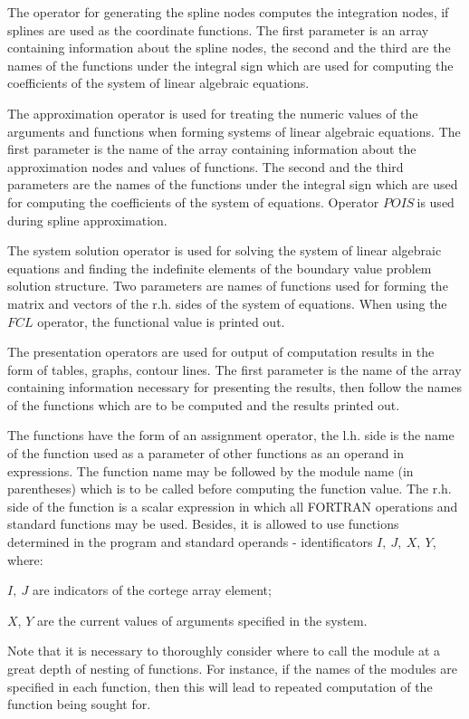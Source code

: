 The operator for generating the spline nodes computes the integration nodes,
if splines are used as the coordinate functions. The first parameter is an
array containing information about the spline nodes, the second and the
third are the names of the functions under the integral sign which are used
for computing the coefficients of the system of linear algebraic equations.

The approximation operator is used for treating the numeric values of the
arguments and functions when forming systems of linear algebraic equations.
The first parameter is the name of the array containing information about
the approximation nodes and values of functions. The second and the third
parameters are the names of the functions under the integral sign which are
used for computing the coefficients of the system of equations. Operator $%
POIS\ $is used during spline approximation.

The system solution operator is used for solving the system of linear
algebraic equations and finding the indefinite elements of the boundary
value problem solution structure. Two parameters are names of functions used
for forming the matrix and vectors of the r.h. sides of the system of
equations. When using the $FCL$ operator, the functional value is printed
out.

The presentation operators are used for output of computation results in the
form of tables, graphs, contour lines. The first parameter is the name of
the array containing information necessary for presenting the results, then
follow the names of the functions which are to be computed and the results
printed out.

The functions have the form of an assignment operator, the l.h. side is the
name of the function used as a parameter of other functions as an operand in
expressions. The function name may be followed by the module name (in
parentheses) which is to be called before computing the function value. The
r.h. side of the function is a scalar expression in which all FORTRAN
operations and standard functions may be used. Besides, it is allowed to use
functions determined in the program and standard operands - identificators $%
I,\ J,\ X,\ Y$, where:

$I,\ J$ are indicators of the cortege array element;

$X$, $Y$ are the current values of arguments specified in the system.

Note that it is necessary to thoroughly consider where to call the module at
a great depth of nesting of functions. For instance, if the names of the
modules are specified in each function, then this will lead to repeated
computation of the function being sought for.

